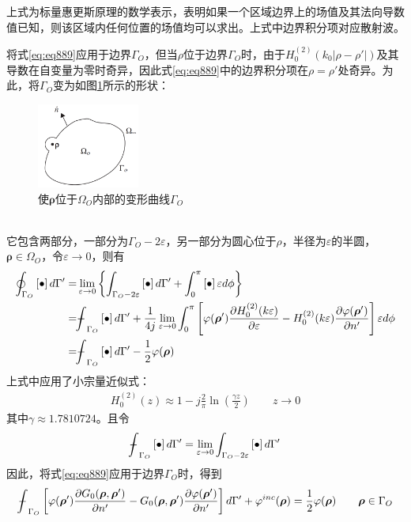 \documentclass{article}
\numberwithin{equation}{section}
\renewcommand{\vec}[1]{\boldsymbol{#1}}
\begin{document}
上式为标量惠更斯原理的数学表示，表明如果一个区域边界上的场值及其法向导数值已知，则该区域内任何位置的场值均可以求出。上式中边界积分项对应散射波。\par
将式\ref{eq:eq889}应用于边界$\Gamma_O$，但当$\rho$位于边界$\Gamma_O$时，由于$H_0^{(2)}(k_0|\rho-\rho'|)$及其导数在自变量为零时奇异，因此式\ref{eq:eq889}中的边界积分项在$\rho=\rho'$处奇异。为此，将$\Gamma_O$变为如图\ref{fig:fig64}所示的形状：
\begin{figure}[ht]
    \centering
    \includegraphics[width=0.3\textwidth]{使rho位于Omega_O内部的变形曲线Gamma_O.PNG}
    \caption{使$\vec{\rho}$位于$\Omega_O$内部的变形曲线$\Gamma_O$}
    \label{fig:fig64}
\end{figure}
\\
它包含两部分，一部分为$\Gamma_O-2\varepsilon$，另一部分为圆心位于$\rho$，半径为$\varepsilon$的半圆，$\vec{\rho}\in\Omega_O$，令$\varepsilon\to 0$，则有
\begin{align}
    \label{eq:eq890}
    \oint_{\Gamma_O}\left[\bullet\right]d\Gamma'=&\lim_{\varepsilon\to 0}\left\{\int_{\Gamma_O-2\varepsilon}\left[\bullet\right]d\Gamma'+\int_0^{\pi}\left[\bullet\right]\varepsilon d\phi\right\} \nonumber \\
                                                =&\bbint_{\Gamma_O}\left[\bullet\right]d\Gamma'+\frac{1}{4j}\lim_{\varepsilon\to 0}\int_0^{\pi}\left[\varphi(\vec{\rho}')\frac{\partial H_0^{(2)}(k\varepsilon)}{\partial \varepsilon}-H_0^{(2)}(k\varepsilon)\frac{\partial \varphi(\vec{\rho}')}{\partial n'}\right]\varepsilon d\phi \nonumber \\
                                                =&\bbint_{\Gamma_O}\left[\bullet\right]d\Gamma'-\frac{1}{2}\varphi(\vec{\rho})
\end{align}
上式中应用了小宗量近似式：
\begin{align}
    \label{eq:eq891}
    H_0^{(2)}(z)\approx 1-j\frac{2}{\pi}\ln\left(\frac{\gamma z}{2}\right)\qquad z\to 0
\end{align}
其中$\gamma\approx 1.7810724$。且令
\begin{align}
    \label{eq:eq892}
    \bbint_{\Gamma_O}\left[\bullet\right]d\Gamma'=\lim_{\varepsilon\to 0}\int_{\Gamma_O-2\varepsilon}\left[\bullet\right]d\Gamma'
\end{align}
因此，将式\ref{eq:eq889}应用于边界$\Gamma_O$时，得到
\begin{align}
    \label{eq:eq893}
    \bbint_{\Gamma_O}\left[\varphi(\vec{\rho}')\frac{\partial G_0(\vec{\rho},\vec{\rho}')}{\partial n'}-G_0(\vec{\rho},\vec{\rho}')\frac{\partial \varphi(\vec{\rho}')}{\partial n'}\right]d\Gamma'+\varphi^{inc}(\vec{\rho})=\frac{1}{2}\varphi(\vec{\rho})\qquad\vec{\rho}\in\Gamma_O
\end{align}
\end{document}
